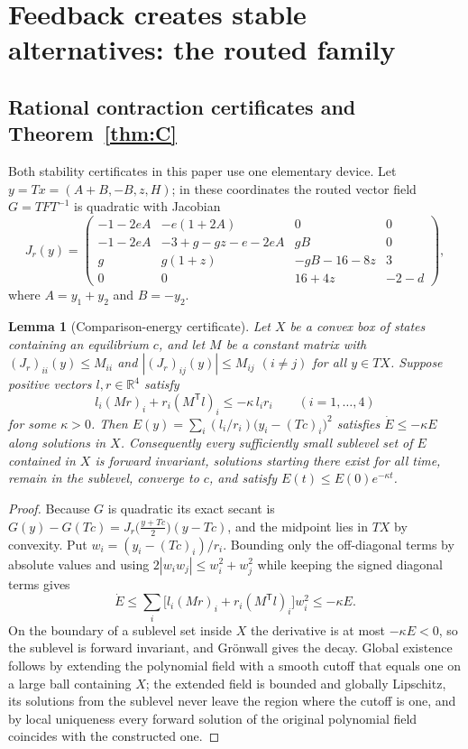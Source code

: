 \documentclass[11pt,a4paper]{article}
\theoremstyle{plain}
\newtheorem{lemma}[theorem]{Lemma}
\theoremstyle{definition}
\theoremstyle{remark}
\newcommand{\R}{\mathbb{R}}
\begin{document}
\section{Feedback creates stable alternatives: the routed family}\label{sec:feedback}

\subsection{Rational contraction certificates and Theorem~\ref{thm:C}}

Both stability certificates in this paper use one elementary device. Let $y=Tx=(A+B,-B,z,H)$; in these coordinates the routed vector field $G=TFT^{-1}$ is quadratic with Jacobian
\begin{equation}\label{eq:Jr}
J_r(y)=\begin{pmatrix}
-1-2eA&-e(1+2A)&0&0\\
-1-2eA&-3+g-gz-e-2eA&gB&0\\
g&g(1+z)&-gB-16-8z&3\\
0&0&16+4z&-2-d
\end{pmatrix},
\end{equation}
where $A=y_1+y_2$ and $B=-y_2$.

\begin{lemma}[Comparison-energy certificate]\label{lem:certificate}
Let $X$ be a convex box of states containing an equilibrium $c$, and let $M$ be a constant matrix with $(J_r)_{ii}(y)\le M_{ii}$ and $|(J_r)_{ij}(y)|\le M_{ij}$ $(i\ne j)$ for all $y\in TX$. Suppose positive vectors $l,r\in\R^4$ satisfy
\begin{equation}\label{eq:row}
l_i(Mr)_i+r_i(M^{\mathsf T}l)_i\le-\kappa\,l_ir_i\qquad(i=1,\dots,4)
\end{equation}
for some $\kappa>0$. Then $E(y)=\sum_i(l_i/r_i)\bigl(y_i-(Tc)_i\bigr)^2$ satisfies $\dot E\le-\kappa E$ along solutions in $X$. Consequently every sufficiently small sublevel set of $E$ contained in $X$ is forward invariant, solutions starting there exist for all time, remain in the sublevel, converge to $c$, and satisfy $E(t)\le E(0)e^{-\kappa t}$.
\end{lemma}
\begin{proof}
Because $G$ is quadratic its exact secant is $G(y)-G(Tc)=J_r\bigl(\tfrac{y+Tc}{2}\bigr)(y-Tc)$, and the midpoint lies in $TX$ by convexity. Put $w_i=(y_i-(Tc)_i)/r_i$. Bounding only the off-diagonal terms by absolute values and using $2|w_iw_j|\le w_i^2+w_j^2$ while keeping the signed diagonal terms gives
\[
\dot E\le\sum_i\bigl[l_i(Mr)_i+r_i(M^{\mathsf T}l)_i\bigr]w_i^2\le-\kappa E .
\]
On the boundary of a sublevel set inside $X$ the derivative is at most $-\kappa E<0$, so the sublevel is forward invariant, and Gr\"onwall gives the decay. Global existence follows by extending the polynomial field with a smooth cutoff that equals one on a large ball containing $X$; the extended field is bounded and globally Lipschitz, its solutions from the sublevel never leave the region where the cutoff is one, and by local uniqueness every forward solution of the original polynomial field coincides with the constructed one.
\end{proof}
\end{document}
